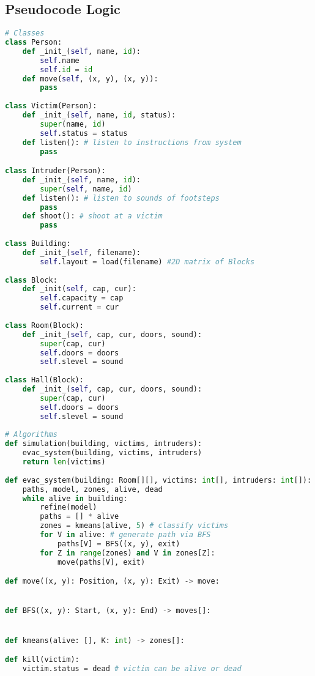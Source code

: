 \documentclass[12pt]{article}
\begin{document}
\subsection*{Pseudocode Logic}
\begin{lstlisting}[language=python]
# Classes
class Person:
	def _init_(self, name, id):
		self.name
		self.id = id
	def move(self, (x, y), (x, y)):
		pass
		
class Victim(Person):
	def _init_(self, name, id, status):
		super(name, id)
		self.status = status
	def listen(): # listen to instructions from system
		pass

class Intruder(Person):
	def _init_(self, name, id):
		super(self, name, id)
	def listen(): # listen to sounds of footsteps
		pass
	def shoot(): # shoot at a victim
		pass
		
class Building:
	def _init_(self, filename):
		self.layout = load(filename) #2D matrix of Blocks
		
class Block:
	def _init(self, cap, cur):
		self.capacity = cap
		self.current = cur
		
class Room(Block):
	def _init_(self, cap, cur, doors, sound):
		super(cap, cur)
		self.doors = doors
		self.slevel = sound
		
class Hall(Block):
	def _init_(self, cap, cur, doors, sound):
		super(cap, cur)
		self.doors = doors
		self.slevel = sound
	
# Algorithms
def simulation(building, victims, intruders):
	evac_system(building, victims, intruders)
	return len(victims)
	
def evac_system(building: Room[][], victims: int[], intruders: int[]):
	paths, model, zones, alive, dead
	while alive in building: 
		refine(model)
		paths = [] * alive
		zones = kmeans(alive, 5) # classify victims
		for V in alive: # generate path via BFS
			paths[V] = BFS((x, y), exit) 
		for Z in range(zones) and V in zones[Z]:
			move(paths[V], exit)

def move((x, y): Position, (x, y): Exit) -> move:


def BFS((x, y): Start, (x, y): End) -> moves[]:


def kmeans(alive: [], K: int) -> zones[]:

def kill(victim):
	victim.status = dead # victim can be alive or dead

\end{lstlisting}
\end{document}
